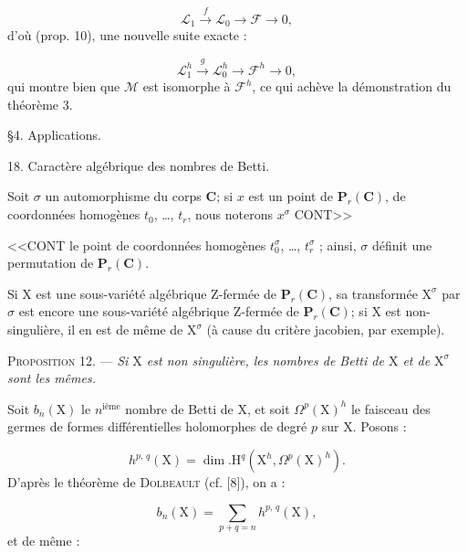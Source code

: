 \begin{equation*}
\mathcal{L}_1 \xrightarrow{\ f\ } \mathcal{L}_0 \to \mathcal{F} \to 0,
\end{equation*}
d'où (prop. 10), une nouvelle suite exacte :

\begin{equation*}
\mathcal{L}_1^h \xrightarrow{\ g\ } \mathcal{L}_0^h \to \mathcal{F}^h \to 0,
\end{equation*}
qui montre bien que $\mathcal{M}$ est isomorphe à $\mathcal{F}^h$, ce qui achève la démonstration du théorème 3.


\S 4. Applications.


18. Caractère algébrique des nombres de Betti.

Soit $\sigma$ un automorphisme du corps $\mathbf{C}$; si $x$ est un point de $\mathbf{P}_r(\mathbf{C})$, de coordonnées homogènes $t_0$, \ldots, $t_r$, nous noterons $x^\sigma$ CONT>>



<<CONT le point de coordonnées homogènes $t_0^\sigma$, \ldots, $t_r^\sigma$ ; ainsi, $\sigma$ définit une permutation de $\mathbf{P}_r(\mathbf{C})$.

Si $\mathrm{X}$ est une sous-variété algébrique Z-fermée de $\mathbf{P}_r(\mathbf{C})$, sa transformée $\mathrm{X}^\sigma$ par $\sigma$ est encore une sous-variété algébrique Z-fermée de $\mathbf{P}_r(\mathbf{C})$; si $\mathrm{X}$ est non-singulière, il en est de même de $\mathrm{X}^\sigma$ (à cause du critère jacobien, par exemple).

\textsc{Proposition} 12. --- \textit{Si $\mathrm{X}$ est non singulière, les nombres de Betti de $\mathrm{X}$ et de $\mathrm{X}^\sigma$ sont les mêmes.}

Soit $b_n(\mathrm{X})$ le $n^{\textrm{ième}}$ nombre de Betti de $\mathrm{X}$, et soit $\Omega^p(\mathrm{X})^h$ le faisceau des germes de formes différentielles holomorphes de degré $p$ sur $\mathrm{X}$. Posons :

\begin{equation*}
h^{p,\,q}(\mathrm{X}) = \dim. \mathrm{H}^q(\mathrm{X}^h, \Omega^p(\mathrm{X})^h).
\end{equation*}
D'après le théorème de \textsc{Dolbeault} (cf. [8]), on a :

\begin{equation*}
b_n(\mathrm{X}) = \sum_{p + q = n} h^{p,\,q}(\mathrm{X}),
\end{equation*}
et de même :


